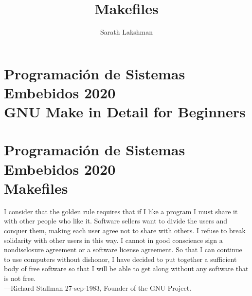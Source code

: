 \documentclass[output=paper, 
colorlinks,
citecolor=brown,
newtxmath
]{langscibook}
\author{Sarath Lakshman}
\title{Makefiles}
\begin{document}

\chapterfont{\Large\color{LightBlue}} 
\chapter*{Programación de Sistemas Embebidos 2020\\ GNU Make in Detail for Beginners}
{\def\addcontentsline#1#2#3{}\maketitle}

\chapter*{Programación de Sistemas Embebidos 2020\\ Makefiles}

\begingroup
\let\clearpage\relax
\cleardoublepage
\hypersetup{linkcolor=blue}
\tableofcontents
\let\clearpage\relax
\cleardoublepage
\endgroup



{\def\addcontentsline#1#2#3{}\maketitle}


\setcounter{page}{1}


\hfill\begin{minipage}{0.8\linewidth} \footnotesize
I consider that the golden rule requires that if I like a program I 
must share it with other people who like it. 
Software sellers want to divide the users and conquer them, making 
each user agree not to share with others. I refuse to break solidarity 
with other users in this way. I cannot in good conscience sign a
nondisclosure agreement or a software license agreement. 
So that I can continue to use computers
without dishonor, I have decided to put together a sufficient body of free software so that I will be able
to get along without any software that is not free.\\
—Richard Stallman 27-sep-1983, Founder of the GNU Project.
\end{minipage}

\end{document}
